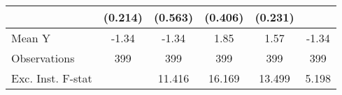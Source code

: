 {\begin{tabular}{l*{5}{c}}
            &     (0.214)         &     (0.563)         &     (0.406)         &     (0.231)         &                     \\
\midrule
Mean Y      &       -1.34         &       -1.34         &        1.85         &        1.57         &       -1.34         \\
Observations&         399         &         399         &         399         &         399         &         399         \\
Exc. Inst. F-stat&                     &      11.416         &      16.169         &      13.499         &       5.198         \\
\bottomrule
\end{tabular}
}
